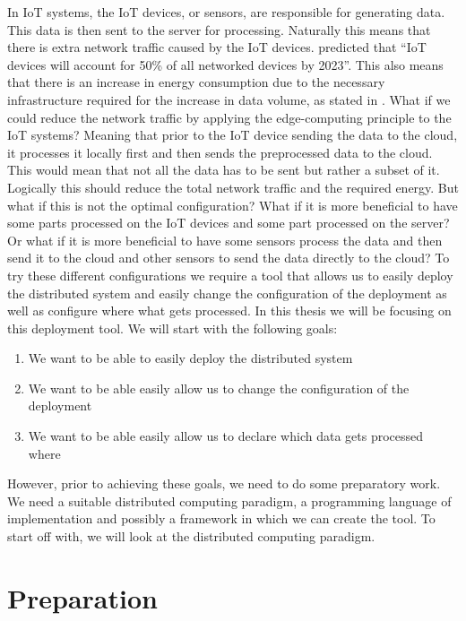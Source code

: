 \documentclass[a4paper]{article}
\begin{document}
In IoT systems, the IoT devices, or sensors, are responsible for generating data. This data is then sent to the server for processing. Naturally this means that there is extra network traffic caused by the IoT devices. \cite{differentnetworkneedsiot} predicted that \enquote{IoT devices will account for 50\% of all networked devices by 2023}. This also means that there is an increase in energy consumption due to the necessary infrastructure required for the increase in data volume, as stated in \cite{datavolumeeffects}. What if we could reduce the network traffic by applying the edge-computing principle to the IoT systems? Meaning that prior to the IoT device sending the data to the cloud, it processes it locally first and then sends the preprocessed data to the cloud. This would mean that not all the data has to be sent but rather a subset of it. Logically this should reduce the total network traffic and the required energy. But what if this is not the optimal configuration? What if it is more beneficial to have some parts processed on the IoT devices and some part processed on the server? Or what if it is more beneficial to have some sensors process the data and then send it to the cloud and other sensors to send the data directly to the cloud? To try these different configurations we require a tool that allows us to easily deploy the distributed system and easily change the configuration of the deployment as well as configure where what gets processed. In this thesis we will be focusing on this deployment tool. We will start with the following goals:
\begin{enumerate}
    \item We want to be able to easily deploy the distributed system
    \item We want to be able easily allow us to change the configuration of the deployment
    \item We want to be able easily allow us to declare which data gets processed where
\end{enumerate}
However, prior to achieving these goals, we need to do some preparatory work. We need a suitable distributed computing paradigm, a programming language of implementation and possibly a framework in which we can create the tool. To start off with, we will look at the distributed computing paradigm.
\section{Preparation}
\end{document}
